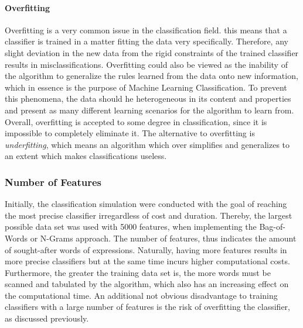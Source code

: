			\paragraph{Overfitting}
				Overfitting is a very common issue in the classification field. this means that a classifier is trained in a matter fitting the data very specifically. Therefore, any slight deviation in the new data from the rigid constraints of the trained classifier results in misclassifications. Overfitting could also be viewed as the inability of the algorithm to generalize the rules learned from the data onto new information, which in essence is the purpose of Machine Learning Classification. To prevent this phenomena, the data should he heterogeneous in its content and properties and present as many different learning scenarios for the algorithm to learn from. Overall, overfitting is accepted to some degree in classification, since it is impossible to completely eliminate it. The alternative to overfitting is \textit{underfitting}, which means an algorithm which over simplifies and generalizes to an extent which makes classifications useless.
		
		\subsubsection{Number of Features}
			Initially, the classification simulation were conducted with the goal of reaching the most precise classifier irregardless of cost and duration. Thereby, the largest possible data set was used with 5000 features, when implementing the Bag-of-Words or N-Grams approach. The number of features, thus indicates the amount of sought-after words of expressions. Naturally, having more features results in more precise classifiers but at the same time incurs higher computational costs. Furthermore, the greater the training data set is, the more words must be scanned and tabulated by the algorithm, which also has an increasing effect on the computational time. An additional not obvious disadvantage to training classifiers with a large number of features is the risk of overfitting the classifier, as discussed previously. \\
			
